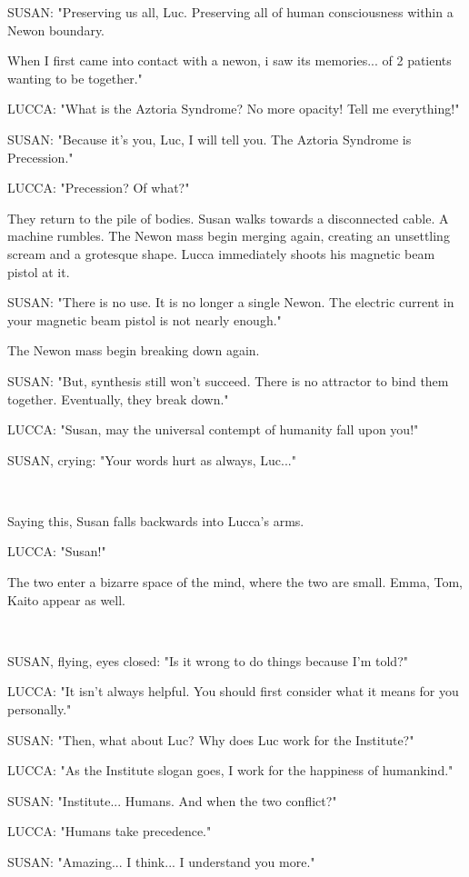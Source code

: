 \documentclass[11pt]{article}
\begin{document}
SUSAN: "Preserving us all, Luc. 
Preserving all of human consciousness within a Newon boundary.

When I first came into contact with a newon, i saw its memories...
of 2 patients wanting to be together."

LUCCA: "What is the Aztoria Syndrome?
No more opacity!
Tell me everything!"

SUSAN: "Because it's you, Luc, I will tell you.
The Aztoria Syndrome is Precession."

LUCCA: "Precession? Of what?"

They return to the pile of bodies. 
Susan walks towards a disconnected cable.
A machine rumbles.
The Newon mass begin merging again, creating an unsettling scream and a grotesque shape.
Lucca immediately shoots his magnetic beam pistol at it.

SUSAN: "There is no use. 
It is no longer a single Newon. 
The electric current in your magnetic beam pistol is not nearly enough."

The Newon mass begin breaking down again.

SUSAN: "But, synthesis still won't succeed.
There is no attractor to bind them together.
Eventually, they break down."

LUCCA: "Susan, may the universal contempt of humanity fall upon you!"

SUSAN, crying: "Your words hurt as always, Luc..."

\ 

Saying this, Susan falls backwards into Lucca's arms.

LUCCA: "Susan!"

The two enter a bizarre space of the mind, where the two are small.
Emma, Tom, Kaito appear as well.

\ 

SUSAN, flying, eyes closed: "Is it wrong to do things because I'm told?"

LUCCA: "It isn't always helpful.
You should first consider what it means for you personally."

SUSAN: "Then, what about Luc? 
Why does Luc work for the Institute?"

LUCCA: "As the Institute slogan goes, I work for the happiness of humankind."

SUSAN: "Institute... Humans. And when the two conflict?"

LUCCA: "Humans take precedence."

SUSAN: "Amazing... I think... I understand you more."
\end{document}
